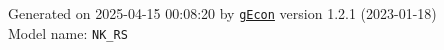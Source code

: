 \documentclass[10pt,a4paper]{article}
\numberwithin{equation}{section}
\begin{document}
\begin{landscape}
\begin{flushleft}{\large
Generated  on 2025-04-15 00:08:20 by \href{http://gecon.r-forge.r-project.org/}{\texttt{gEcon}} version 1.2.1 (2023-01-18)\\
Model name: \verb+NK_RS+
}\end{flushleft}


\end{landscape}

\end{document}
